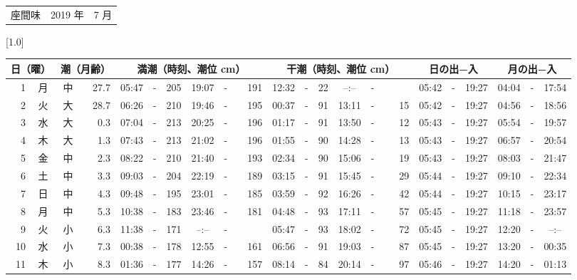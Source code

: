 \documentclass[12pt,a4j]{jsarticle}
\begin{document}
\pagestyle{empty}
 \begin{table}[htbp]
 \begin{center}
 \begin{tabular}{lcc}
 \LARGE{座間味}  & \large{2019 年} & \large{ 7 月} \\
 \end{tabular}
 \end{center}
 \begin{center}
    \scalebox{0.7}[1.0]{
    \begin{tabular}{|rc|cr|ccrccr|ccrccr|ccc|ccc|}
    \hline
    \multicolumn{2}{|c|}{日（曜）} & \multicolumn{2}{c|}{潮（月齢）} & \multicolumn{6}{c|}{満潮（時刻、潮位 cm）} & \multicolumn{6}{c|}{干潮（時刻、潮位 cm）} & \multicolumn{3}{c|}{日の出−入} &  \multicolumn{3}{c|}{月の出−入}\\
 \hline
 1 & 月 & 中 & 27.7 &  05:47 &-& 205 &  19:07 &-& 191 &  12:32 &-&  22 &  --:-- &-&~~~~~ & 05:42 & -& 19:27 & 04:04 & -& 17:54 \\
 2 & 火 & 大 & 28.7 &  06:26 &-& 210 &  19:46 &-& 195 &  00:37 &-&  91 &  13:11 &-&  15 & 05:42 & -& 19:27 & 04:56 & -& 18:56 \\
 3 & 水 & 大 &  0.3 &  07:04 &-& 213 &  20:25 &-& 196 &  01:17 &-&  91 &  13:50 &-&  12 & 05:43 & -& 19:27 & 05:54 & -& 19:57 \\
 4 & 木 & 大 &  1.3 &  07:43 &-& 213 &  21:02 &-& 196 &  01:55 &-&  90 &  14:28 &-&  13 & 05:43 & -& 19:27 & 06:57 & -& 20:54 \\
 5 & 金 & 中 &  2.3 &  08:22 &-& 210 &  21:40 &-& 193 &  02:34 &-&  90 &  15:06 &-&  19 & 05:43 & -& 19:27 & 08:03 & -& 21:47 \\
 6 & 土 & 中 &  3.3 &  09:03 &-& 204 &  22:19 &-& 189 &  03:15 &-&  91 &  15:45 &-&  29 & 05:44 & -& 19:27 & 09:10 & -& 22:34 \\
 7 & 日 & 中 &  4.3 &  09:48 &-& 195 &  23:01 &-& 185 &  03:59 &-&  92 &  16:26 &-&  42 & 05:44 & -& 19:27 & 10:15 & -& 23:17 \\
 8 & 月 & 中 &  5.3 &  10:38 &-& 183 &  23:46 &-& 181 &  04:48 &-&  93 &  17:11 &-&  57 & 05:45 & -& 19:27 & 11:18 & -& 23:57 \\
 9 & 火 & 小 &  6.3 &  11:38 &-& 171 &  --:-- &-&~~~~~ &  05:47 &-&  93 &  18:02 &-&  72 & 05:45 & -& 19:27 & 12:20 & -& --:-- \\
10 & 水 & 小 &  7.3 &  00:38 &-& 178 &  12:55 &-& 161 &  06:56 &-&  91 &  19:03 &-&  87 & 05:45 & -& 19:27 & 13:20 & -& 00:35 \\
11 & 木 & 小 &  8.3 &  01:36 &-& 177 &  14:26 &-& 157 &  08:14 &-&  84 &  20:14 &-&  97 & 05:46 & -& 19:27 & 14:20 & -& 01:13 \\

\end{tabular}}
\end{center}
\end{table}
\end{document}
